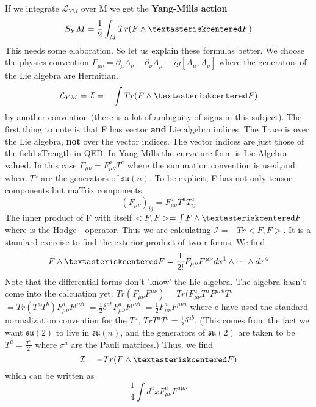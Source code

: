 If we integrate $\mathcal{L}_{YM}$ over M we get the \textbf{Yang-Mills action}
\begin{equation}
 S_YM = \frac{1}{2} \int_M Tr (F \wedge \textasteriskcentered F)
\end{equation}
This needs some elaboration. So let us explain these formulas better.
We choose the physics convention $F_{\mu \nu} = \partial_\mu A_\nu - \partial_\nu A_\mu -ig[A_\mu,A_\nu]$
where the generators of the Lie algebra are Hermitian.
\begin{equation}
 \mathcal{L}_{YM} = \mathcal{I} = - \int Tr(F \wedge \textasteriskcentered F)
\end{equation}
by another convention (there is a lot of ambiguity of signs in this subject).
The first thing to note is that F has vector \textbf{and} Lie algebra indices. The Trace is over the Lie algebra, \textbf{not}
over the vector indices. The vector indices are just those of the field sTrength in QED. In Yang-Mills the curvature
form is Lie Algebra valued.
   \newline In this case $F_{\mu \nu} = F^{a}_{\mu \nu}T^a$ where the summation convention is used,and where $T^a$ are the 
generators of $\mathfrak{su}(n)$. To be explicit, F has not only tensor components but maTrix components
\begin{equation*}
 (F_{\mu \nu})_{ij} = F^{a}_{\mu \nu}T^a T^a_{ij}
\end{equation*}
The inner product of F with itself $<F,F> = \int F \wedge \textasteriskcentered F$ 
where \textasteriskcentered is the Hodge \textasteriskcentered - operator. Thus we are calculating 
$\mathcal{I} = -Tr<F,F>$. It is a standard exercise to find the exterior product of two r-forms. We find
\begin{equation*}
 F \wedge \textasteriskcentered F = \frac{1}{2!}F_{\mu \nu}F^{\mu \nu} dx^1 \wedge \cdots \wedge dx^4
\end{equation*}
Note that the differential forms don't 'know' the Lie algebra. 
The algebra hasn't come into the calcuation yet.
$Tr(F_{\mu \nu}F^{\mu \nu})=Tr(F^{a}_{\mu \nu}T^aF^{\mu \nu b}T^b$
$= Tr(T^aT^b)F^{a}_{\mu \nu}F^{\mu \nu b}$
$= \frac{1}{2}\delta^{ab}F^{a}_{\mu \nu}F^{\mu \nu b}$
$=\frac{1}{2}F^{a}_{\mu \nu}F^{\mu \nu a}$
where e have used the standard normalization convention for the $T^a$, $Tr T^a T^b = \frac{1}{2}\delta^{ab}$. (This comes from the
fact we want $\mathfrak{su}(2)$ to live in $\mathfrak{su}(n)$, and the generators of $\mathfrak{su}(2)$  are taken 
to be $T^a = \frac{\sigma^a}{2}$ where $\sigma^a$ are the Pauli matrices.) Thus, we find
\begin{equation*}
 \mathcal{I} = - Tr (F \wedge \textasteriskcentered F)
\end{equation*}
which can be written as 
\begin{equation*}
 \frac{1}{4} \int d^4 x F^{a}_{\mu \nu}F^{a \mu \nu}
\end{equation*}

